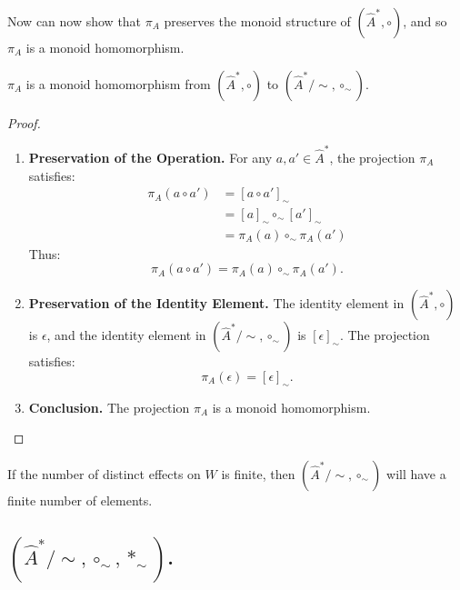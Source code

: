 Now can now show that $\pi_{A}$ preserves the monoid structure of $(\hat{A}^{\ast}, \circ)$, and so $\pi_{A}$ is a monoid homomorphism.
\begin{proposition}
    $\pi_{A}$ is a monoid homomorphism from $(\hat{A}^{\ast}, \circ)$ to $(\hat{A}^{\ast}/\sim, \circ_{\sim})$.
\end{proposition}
\begin{proof}
    \begin{enumerate}[(1)]
        \item \textbf{Preservation of the Operation.}
              For any $a, a' \in \hat{A}^{\ast}$, the projection $\pi_{A}$ satisfies:
              \begin{align}
                  \pi_{A}(a \circ a') & = [a \circ a']_{\sim}                 \\
                                      & = [a]_{\sim} \circ_{\sim} [a']_{\sim} \\
                                      & = \pi_{A}(a) \circ_{\sim} \pi_{A}(a')
              \end{align}
              Thus:
              \begin{equation}
                  \pi_{A}(a \circ a') = \pi_{A}(a) \circ_{\sim} \pi_{A}(a').
              \end{equation}

        \item \textbf{Preservation of the Identity Element.}
              The identity element in $(\hat{A}^{\ast}, \circ)$ is $\epsilon$, and the identity element in $(\hat{A}^{\ast}/\sim, \circ_{\sim})$ is $[\epsilon]_{\sim}$.
              The projection satisfies:
              \begin{equation}
                  \pi_{A}(\epsilon) = [\epsilon]_{\sim}.
              \end{equation}

        \item \textbf{Conclusion.}
              The projection $\pi_{A}$ is a monoid homomorphism.
    \end{enumerate}
\end{proof}

If the number of distinct effects on $W$ is finite, then $(\hat{A}^{\ast}/\sim, \circ_{\sim})$ will have a finite number of elements.

\subsection{$(\hat{A}^{\ast}/\sim, \circ_{\sim}, \ast_{\sim})$.}


